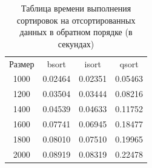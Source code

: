 \documentclass[12pt]{report}
\begin{document}
\begin{table} [h!]
	\caption{Таблица времени выполнения сортировок на отсортированных данных в обратном порядке (в секундах)}
	\begin{center}
	\begin{tabular}{|c c c c|}

		\hline

		Размер & bsort & isort & qsort \\ [0.5ex]

		1000 & 0.02464 & 0.02351 & 0.05463 \\ 

		\hline 
 

		1200 & 0.03504 & 0.03444 & 0.08216 \\ 

		\hline 

		1400 & 0.04539 & 0.04633 & 0.11752 \\ 

		\hline 

		1600 & 0.07741 & 0.06945 & 0.18477 \\ 

		\hline 

		1800 & 0.08010 & 0.07510 & 0.19965 \\ 

		\hline 

		2000 & 0.08919 & 0.08319 & 0.22478 \\ 

		\hline 

	\end{tabular}
	\end{center}
\end{table}
\end{document}
